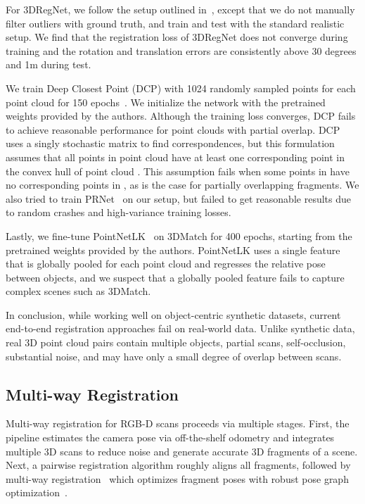 \documentclass[10pt,twocolumn,letterpaper]{article}
\begin{document}
For 3DRegNet, we follow the setup outlined in~\cite{dias2019corr}, except that we do not manually filter outliers with ground truth, and train and test with the standard realistic setup. We find that
the registration loss of 3DRegNet does not converge during training and the rotation and translation errors are consistently above 30 degrees and 1m during test.

We train Deep Closest Point (DCP) with 1024 randomly sampled points for each point cloud for 150 epochs~\cite{wang2019deep}. We initialize the network with the pretrained weights provided by the authors.
Although the training loss converges, DCP fails to achieve reasonable performance for point clouds with partial overlap.
DCP uses a singly stochastic matrix to find correspondences, but this formulation assumes that all points in point cloud  have at least one corresponding point in the convex hull of point cloud . This assumption fails when some points in  have no corresponding points in , as is the case for partially overlapping fragments.
We also tried to train PRNet~\cite{wang2019nips} on our setup, but failed to get reasonable results due to random crashes and high-variance training losses.



Lastly, we fine-tune PointNetLK~\cite{aoki2019pointnetlk} on 3DMatch for 400 epochs, starting from the pretrained weights provided by the authors.
PointNetLK uses a single feature that is globally pooled for each point cloud and regresses the relative pose between objects, and we suspect that a globally pooled feature fails to capture complex scenes such as 3DMatch.


In conclusion, while working well on object-centric synthetic datasets, current end-to-end registration approaches fail on real-world data. Unlike synthetic data, real 3D point cloud pairs contain multiple objects, partial scans, self-occlusion, substantial noise, and may have only a small degree of overlap between scans.




\subsection{Multi-way Registration}
Multi-way registration for RGB-D scans proceeds via multiple stages. First, the pipeline estimates the camera pose via off-the-shelf odometry and integrates multiple 3D scans to reduce noise and generate accurate 3D fragments of a scene. Next, a pairwise registration algorithm roughly aligns all fragments, followed by multi-way registration~\cite{choi2015cvpr} which optimizes fragment poses with robust pose graph optimization~\cite{kummerle2011g}.
\end{document}
